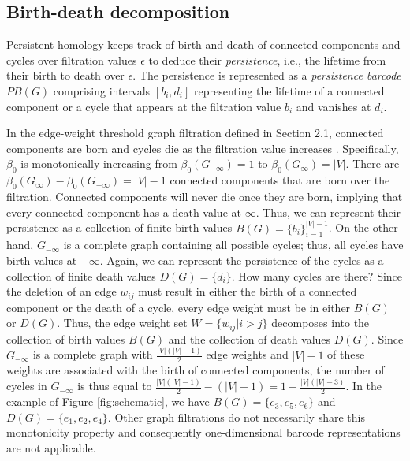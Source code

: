 \documentclass{article} %
\begin{document}
\subsection{Birth-death decomposition}
\label{subsec:bd-decomposition}

Persistent homology keeps track of birth and death of connected components and cycles over filtration values $\epsilon$ to deduce their {\em persistence}, i.e., the lifetime from their birth to death over $\epsilon$.
The persistence is represented as a {\em persistence barcode} $PB(G)$ comprising intervals $[b_i,d_i]$ representing the lifetime of a connected component or a cycle that appears at the filtration value $b_i$ and vanishes at $d_i$.

In the edge-weight threshold graph filtration defined in Section 2.1, connected components are born and cycles die as the filtration value increases \citep{songdechakraiwut2021topological}.
Specifically, $\beta_0$ is monotonically increasing from $\beta_0(G_{-\infty}) = 1$ to  $\beta_0(G_{\infty}) = |V|$.
There are $\beta_0(G_{\infty}) - \beta_0(G_{-\infty}) = |V| - 1$ connected components that are born over the filtration. Connected components will never die once they are born, implying that every connected component has a death value at $\infty$. Thus, we can represent their persistence as a collection of finite birth values $B(G) = \{b_i \}_{i=1}^{|V|-1}$.
On the other hand, $G_{-\infty}$ is a complete graph containing all possible cycles; thus, all cycles have birth values at $-\infty$. Again, we can represent the persistence of the cycles as a collection of finite death values $D(G)=\{ d_i \}$.
How many cycles are there? Since the deletion of an edge $w_{ij}$ must result in either the birth of a connected component or the death of a cycle, every edge weight must be in either $B(G)$ or $D(G)$. Thus, the edge weight set $W=\{w_{ij} | i>j\}$ decomposes into the collection of birth values $B(G)$ and the collection of death values $D(G)$. Since $G_{-\infty}$ is a complete graph with $\frac{|V|(|V|-1)}{2}$ edge weights and $|V|-1$ of these weights are associated with the birth of connected components, the number of cycles in $G_{-\infty}$ is thus equal to $\frac{|V|(|V|-1)}{2} - (|V|-1) = 1 + \frac{|V| (|V| - 3)}{2}$.
In the example of Figure \ref{fig:schematic}, we have $B(G)=\{e_3,e_5,e_6\}$ and $D(G)=\{e_1,e_2,e_4\}$.
Other graph filtrations \citep{carriere2020perslay,hofer2020graph} do not necessarily share this monotonicity property and consequently one-dimensional barcode representations are not applicable.
\end{document}
